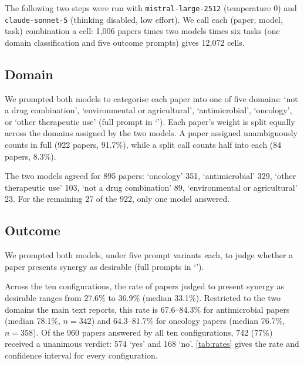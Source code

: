 \documentclass[openacc]{rstb}
\begin{document}
The following two steps were run with \texttt{mistral-large-2512} (temperature 0) and \texttt{claude-sonnet-5} (thinking disabled, low effort).
We call each (paper, model, task) combination a cell: 1{,}006 papers times two models times six tasks (one domain classification and five outcome prompts) gives 12{,}072 cells.

\subsection{Domain}
\label{sec:domain}
We prompted both models to categorise each paper into one of five domains: `not a drug combination', `environmental or agricultural', `antimicrobial', `oncology', or `other therapeutic use' (full prompt in `').
Each paper's weight is split equally across the domains assigned by the two models.
A paper assigned unambiguously counts in full (922 papers, 91.7\%), while a split call counts half into each (84 papers, 8.3\%).

The two models agreed for 895 papers: `oncology' 351, `antimicrobial' 329, `other therapeutic use' 103, `not a drug combination' 89, `environmental or agricultural' 23.
For the remaining 27 of the 922, only one model answered.

\subsection{Outcome}
We prompted both models, under five prompt variants each, to judge whether a paper presents synergy as desirable (full prompts in `').

Across the ten configurations, the rate of papers judged to present synergy as desirable ranges from 27.6\% to 36.9\% (median 33.1\%).
Restricted to the two domains the main text reports, this rate is 67.6--84.3\% for antimicrobial papers (median 78.1\%, $n=342$) and 64.3--81.7\% for oncology papers (median 76.7\%, $n=358$).
Of the 960 papers answered by all ten configurations, 742 (77\%) received a unanimous verdict: 574 `yes' and 168 `no'.
\autoref{tab:rates} gives the rate and confidence interval for every configuration.
\end{document}
